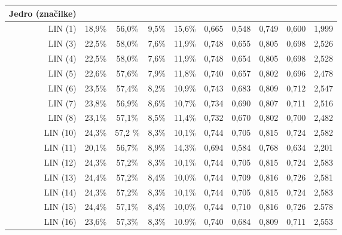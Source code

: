 \documentclass[11pt,a4paper,openany]{book}
\begin{document}
\begin{table}[h!]
	\centering
	\begin{tabular}{r|cccc|cccc|c}		
		\textbf{Jedro \hfill \break (značilke)} & 
			\rotatebox[origin=l]{90}{pravilno pozitivni} & 
			\rotatebox[origin=l]{90}{pravilno negativni} & 
			\rotatebox[origin=l]{90}{napačno pozitivni} & 
			\rotatebox[origin=l]{90}{napačno negativni} &
			\rotatebox[origin=l]{90}{natančnost} & 
			\rotatebox[origin=l]{90}{priklic} & 
			\rotatebox[origin=l]{90}{točnost} & 
			\rotatebox[origin=l]{90}{ocena $F_1$} & 
			\rotatebox[origin=l]{90}{ocena $AMS_2$} \\
		\hline	
		
		LIN (1) & 18,9\% & 56,0\% & 9,5\% & 15,6\% &
			0,665 & 0,548 & 0,749 & 0,600 &
			1,999 \\
		LIN (3) & 22,5\% & 58,0\% & 7,6\% & 11,9\% &
			0,748 & 0,655 & 0,805 & 0,698 &
			2,526 \\
		LIN (4) & 22,5\% & 58,0\% & 7,6\% & 11,9\% &
			0,748 & 0,654 & 0,805 & 0,698 &
			2,528 \\
		LIN (5) & 22,6\% & 57,6\% & 7,9\% & 11,8\% &
			0,740 & 0,657 & 0,802 & 0,696 &
			2,478 \\
		LIN (6) & 23,5\% & 57,4\% & 8,2\% & 10,9\% &
			0,743 & 0,683 & 0,809 & 0,712 & 
			2,547 \\
		LIN (7) & 23,8\% & 56,9\% & 8,6\% & 10,7\% &
			0,734 & 0,690 & 0,807 & 0,711 & 
			2,516 \\
		LIN (8) & 23,1\% & 57,1\%&  8,5\% & 11,4\% &
			0,732 & 0,670 & 0,802 & 0,700 &
			2,482 \\		
		LIN (10) & 24,3\% & 57,2 \% & 8,3\% & 10,1\% &
			0,744 & 0,705 & 0,815 & 0,724 &
			2,582 \\	
		LIN (11) & 20,1\% & 56,7\% & 8,9\% & 14,3\% &
			0,694 & 0,584 & 0,768 & 0,634 &
			2,201 \\
		LIN (12) & 24,3\% & 57,2\% & 8,3\% & 10,1\% &
			0,744 & 0,705 & 0,815 & 0,724 &
			2,583 \\
		LIN (13) & 24,4\% & 57,2\% & 8,4\% & 10,0\% &
			0,744 & 0,709 & 0,816 & 0,726 &
			2,581 \\
		LIN (14) & 24,3\% & 57,2\% & 8,3\% & 10,1\% &
			0,744 & 0,705 & 0,815 & 0,724 &
			2,583 \\
		LIN (15) & 24,4\% & 57,1\% & 8,4\% & 10,0\% & 
			0,744 & 0,710 & 0,816 & 0,726 &
			2.578 \\
		LIN (16) & 23,6\% & 57,3\% & 8,3\% & 10.9\% &
			0,740 & 0,684 & 0,809 & 0,711 &
			2,553 \\	
		

\end{tabular}
\end{table}
\end{document}
